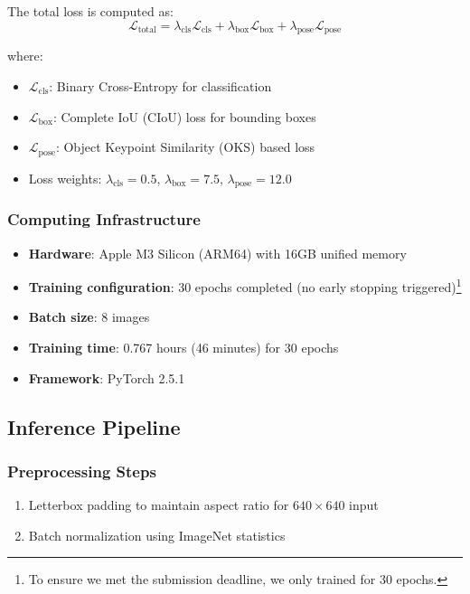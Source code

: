 \documentclass[11pt]{article}
\begin{document}
The total loss is computed as:
\begin{equation}
\mathcal{L}_{\text{total}} = \lambda_{\text{cls}} \mathcal{L}_{\text{cls}} + \lambda_{\text{box}} \mathcal{L}_{\text{box}} + \lambda_{\text{pose}} \mathcal{L}_{\text{pose}}
\end{equation}

where:
\begin{itemize}[noitemsep]
    \item $\mathcal{L}_{\text{cls}}$: Binary Cross-Entropy for classification
    \item $\mathcal{L}_{\text{box}}$: Complete IoU (CIoU) loss for bounding boxes
    \item $\mathcal{L}_{\text{pose}}$: Object Keypoint Similarity (OKS) based loss
    \item Loss weights: $\lambda_{\text{cls}} = 0.5$, $\lambda_{\text{box}} = 7.5$, $\lambda_{\text{pose}} = 12.0$
\end{itemize}

\subsubsection{Computing Infrastructure}

\begin{itemize}[noitemsep]
    \item \textbf{Hardware}: Apple M3 Silicon (ARM64) with 16GB unified memory
    \item \textbf{Training configuration}: 30 epochs completed (no early stopping triggered)\footnote{To ensure we met the submission deadline, we only trained for 30 epochs.}
    \item \textbf{Batch size}: 8 images
    \item \textbf{Training time}: 0.767 hours (46 minutes) for 30 epochs
    \item \textbf{Framework}: PyTorch 2.5.1
\end{itemize}

\subsection{Inference Pipeline}

\subsubsection{Preprocessing Steps}

\begin{enumerate}[noitemsep]
    \item Letterbox padding to maintain aspect ratio for $640 \times 640$ input
    \item Batch normalization using ImageNet statistics
\end{enumerate}
\end{document}
